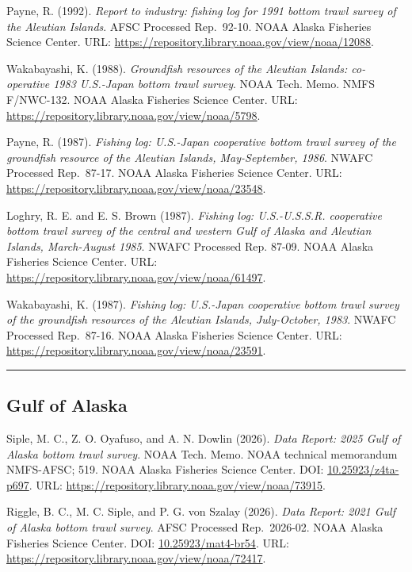 \documentclass[
  letterpaper,
  oneside,
  open=any]{scrbook}
\begin{document}
Payne, R. (1992). \emph{Report to industry: fishing log for 1991 bottom
trawl survey of the Aleutian Islands}. AFSC Processed Rep.~92-10. NOAA
Alaska Fisheries Science Center. URL:
\url{https://repository.library.noaa.gov/view/noaa/12088}.

Wakabayashi, K. (1988). \emph{Groundfish resources of the Aleutian
Islands: co-operative 1983 U.S.-Japan bottom trawl survey}. NOAA Tech.
Memo. NMFS F/NWC-132. NOAA Alaska Fisheries Science Center. URL:
\url{https://repository.library.noaa.gov/view/noaa/5798}.

Payne, R. (1987). \emph{Fishing log: U.S.-Japan cooperative bottom trawl
survey of the groundfish resource of the Aleutian Islands,
May-September, 1986}. NWAFC Processed Rep.~87-17. NOAA Alaska Fisheries
Science Center. URL:
\url{https://repository.library.noaa.gov/view/noaa/23548}.

Loghry, R. E. and E. S. Brown (1987). \emph{Fishing log: U.S.-U.S.S.R.
cooperative bottom trawl survey of the central and western Gulf of
Alaska and Aleutian Islands, March-August 1985}. NWAFC Processed Rep.
87-09. NOAA Alaska Fisheries Science Center. URL:
\url{https://repository.library.noaa.gov/view/noaa/61497}.

Wakabayashi, K. (1987). \emph{Fishing log: U.S.-Japan cooperative bottom
trawl survey of the groundfish resources of the Aleutian Islands,
July-October, 1983}. NWAFC Processed Rep.~87-16. NOAA Alaska Fisheries
Science Center. URL:
\url{https://repository.library.noaa.gov/view/noaa/23591}.

\begin{center}\rule{0.5\linewidth}{0.5pt}\end{center}

\subsection{Gulf of Alaska}\label{gulf-of-alaska-1}

Siple, M. C., Z. O. Oyafuso, and A. N. Dowlin (2026). \emph{Data Report:
2025 Gulf of Alaska bottom trawl survey}. NOAA Tech. Memo. NOAA
technical memorandum NMFS-AFSC; 519. NOAA Alaska Fisheries Science
Center. DOI:
\href{https://doi.org/10.25923\%2Fz4ta-p697}{10.25923/z4ta-p697}. URL:
\url{https://repository.library.noaa.gov/view/noaa/73915}.

Riggle, B. C., M. C. Siple, and P. G. von Szalay (2026). \emph{Data
Report: 2021 Gulf of Alaska bottom trawl survey}. AFSC Processed
Rep.~2026-02. NOAA Alaska Fisheries Science Center. DOI:
\href{https://doi.org/10.25923\%2Fmat4-br54}{10.25923/mat4-br54}. URL:
\url{https://repository.library.noaa.gov/view/noaa/72417}.
\end{document}
